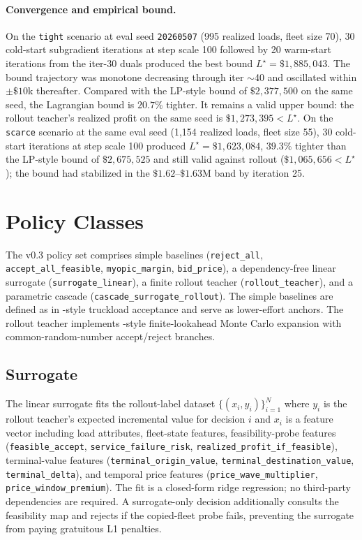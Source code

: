 \documentclass[11pt]{article}
\begin{document}
\paragraph{Convergence and empirical bound.}
On the \texttt{tight} scenario at eval seed \texttt{20260507} (995
realized loads, fleet size 70), 30 cold-start subgradient iterations at
step scale 100 followed by 20 warm-start iterations from the iter-30
duals produced the best bound $L^\star = \$1{,}885{,}043$. The bound
trajectory was monotone decreasing through iter $\sim$40 and oscillated
within $\pm \$10$k thereafter. Compared with the LP-style bound of
$\$2{,}377{,}500$ on the same seed, the Lagrangian bound is $20.7\%$
tighter. It remains a valid upper bound: the rollout teacher's
realized profit on the same seed is $\$1{,}273{,}395 < L^\star$. On the
\texttt{scarce} scenario at the same eval seed (1{,}154 realized loads,
fleet size 55), 30 cold-start iterations at step scale 100 produced
$L^\star = \$1{,}623{,}084$, $39.3\%$ tighter than the LP-style bound of
$\$2{,}675{,}525$ and still valid against rollout
($\$1{,}065{,}656 < L^\star$); the bound had stabilized in the
$\$1.62$--$\$1.63$M band by iteration 25.

\section{Policy Classes}
\label{sec:policies}

The v0.3 policy set comprises simple baselines (\texttt{reject\_all},
\texttt{accept\_all\_feasible}, \texttt{myopic\_margin}, \texttt{bid\_price}),
a dependency-free linear surrogate (\texttt{surrogate\_linear}), a finite
rollout teacher (\texttt{rollout\_teacher}), and a parametric cascade
(\texttt{cascade\_surrogate\_rollout}). The simple baselines are defined
as in \citet{kim2004dynamic}-style truckload acceptance and serve as
lower-effort anchors. The rollout teacher implements
\citet{bertsekas1997rollout}-style finite-lookahead Monte Carlo expansion
with common-random-number accept/reject branches.

\subsection{Surrogate}

\begin{sloppypar}
The linear surrogate fits the rollout-label dataset
$\{(x_i, y_i)\}_{i=1}^{N}$ where $y_i$ is the rollout teacher's expected
incremental value for decision $i$ and $x_i$ is a feature vector
including load attributes, fleet-state features, feasibility-probe
features (\texttt{feasible\_accept}, \texttt{service\_failure\_risk},
\texttt{realized\_profit\_if\_feasible}), terminal-value features
(\texttt{terminal\_origin\_value}, \texttt{terminal\_destination\_value},
\texttt{terminal\_delta}), and temporal price features
(\texttt{price\_wave\_multiplier}, \texttt{price\_window\_premium}). The
fit is a closed-form ridge regression; no third-party dependencies are
required. A surrogate-only decision additionally consults the feasibility
map and rejects if the copied-fleet probe fails, preventing the surrogate
from paying gratuitous L1 penalties.
\end{sloppypar}
\end{document}
